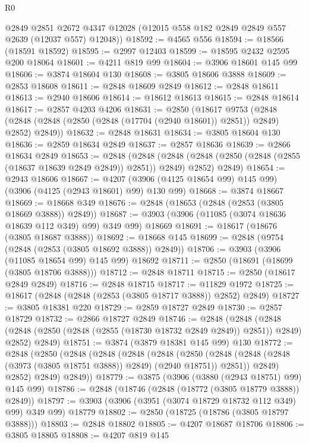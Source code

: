 \begin{lexlean}{R0}
\begin{coremodule}
      @2849
      @2851
      @2672
      @4347
      @12028
      (@12015 @558 @182 @2849 @2849 @557 @2639 (@12037 @557) @12048))
@18592 := @4565 @556
@18594 := @18566 (@18591 @18592)
@18595 := @2997 @12403
@18599 := @18595 @2432 @2595 @200 @18064
@18601 := @4211 @819 @99
@18604 := @3906 @18601 @145 @99
@18606 := @3874 @18604 @130
@18608 := @3805 @18606 @3888
@18609 := @2853 @18608
@18611 := @2848 @18609 @2849
@18612 := @2848 @18611
@18613 := @2940 @18606
@18614 := @18612 @18613
@18615 := @2848 @18614
@18617 := @2857 @4203 @4206
@18631 := @2850
    (@18617
      @9753
      (@2848 (@2848 (@2848 (@2850 (@2848 (@17704 (@2940 @18601)) @2851)) @2849) @2852) @2849))
@18632 := @2848 @18631
@18634 := @3805 @18604 @130
@18636 := @2859 @18634 @2849
@18637 := @2857 @18636
@18639 := @2866 @18634 @2849
@18653 := @2848
    (@2848
      (@2848 (@2848 (@2850 (@2848 (@2855 (@18637 @18639 @2849 @2849)) @2851)) @2849) @2852)
      @2849)
@18654 := @2943 @18606
@18667 := @4207 (@3906 (@4125 @18654 @99) @145 @99) (@3906 (@4125 (@2943 @18601) @99) @130 @99)
@18668 := @3874 @18667
@18669 := @18668 @349
@18676 := @2848 (@18653 (@2848 (@2853 (@3805 @18669 @3888)) @2849))
@18687 := @3903 (@3906 (@11085 (@3074 @18636 @18639 @112 @349) @99) @349 @99) @18669
@18691 := @18617 (@18676 (@3805 @18687 @3888))
@18692 := @18668 @145
@18699 := @2848 (@9754 (@2848 (@2853 (@3805 @18692 @3888)) @2849))
@18706 := @3903 (@3906 (@11085 @18654 @99) @145 @99) @18692
@18711 := @2850 (@18691 (@18699 (@3805 @18706 @3888)))
@18712 := @2848 @18711
@18715 := @2850 (@18617 @2849 @2849)
@18716 := @2848 @18715
@18717 := @11829 @1972
@18725 := @18617 (@2848 (@2848 (@2853 (@3805 @18717 @3888)) @2852) @2849)
@18727 := @3805 @18381 @220
@18729 := @2859 @18727 @2849
@18730 := @2857 @18729
@18732 := @2866 @18727 @2849
@18746 := @2848
    (@2848
      (@2848 (@2848 (@2850 (@2848 (@2855 (@18730 @18732 @2849 @2849)) @2851)) @2849) @2852)
      @2849)
@18751 := @3874 (@3879 @18381 @145 @99) @130
@18772 := @2848
    (@2850
      (@2848
        (@2848
          (@2848
            (@2848
              (@2850
                (@2848 (@2848 (@2848 (@3973 (@3805 @18751 @3888)) @2849) (@2940 @18751)) @2851))
              @2849)
            @2852)
          @2849)
        @2849))
@18779 := @3875 (@3906 (@3880 (@2943 @18751) @99) @145 @99)
@18786 := @2848 (@18746 (@2848 (@18772 (@3805 @18779 @3888)) @2849))
@18797 := @3903 (@3906 (@3951 (@3074 @18729 @18732 @112 @349) @99) @349 @99) @18779
@18802 := @2850 (@18725 (@18786 (@3805 @18797 @3888)))
@18803 := @2848 @18802
@18805 := @4207 @18687 @18706
@18806 := @3805 @18805
@18808 := @4207 @819 @145

\end{coremodule}
\end{lexlean}
